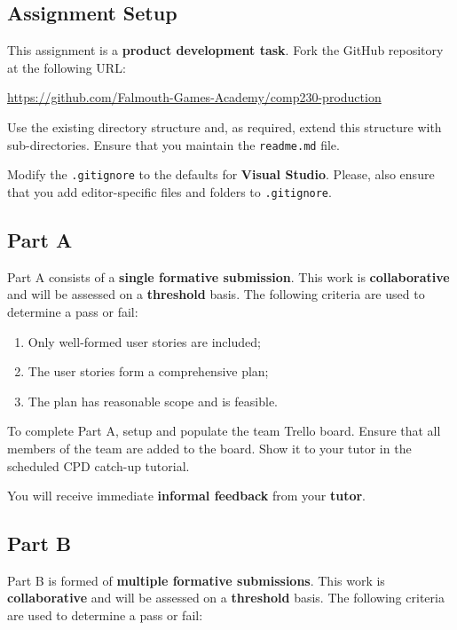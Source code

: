 \documentclass{../fal_assignment}
\begin{document}
\subsection*{Assignment Setup}

This assignment is a \textbf{product development task}. Fork the GitHub repository at the following URL:

\indent \url{https://github.com/Falmouth-Games-Academy/comp230-production}

Use the existing directory structure and, as required, extend this structure with sub-directories. Ensure that you maintain the \texttt{readme.md} file.

Modify the \texttt{.gitignore} to the defaults for \textbf{Visual Studio}. Please, also ensure that you add editor-specific files and folders to \texttt{.gitignore}. 

\subsection*{Part A}

Part A consists of a \textbf{single formative submission}. This work is \textbf{collaborative} and will be assessed on a \textbf{threshold} basis. The following criteria are used to determine a pass or fail:

\begin{enumerate}[label=(\alph*)]
	\item Only well-formed user stories are included;
	\item The user stories form a comprehensive plan;
	\item The plan has reasonable scope and is feasible.
\end{enumerate}

To complete Part A, setup and populate the team Trello board. Ensure that all members of the team are added to the board. Show it to your tutor in the scheduled CPD catch-up tutorial.

You will receive immediate \textbf{informal feedback} from your \textbf{tutor}.

\subsection*{Part B}

Part B is formed of \textbf{multiple formative submissions}. This work is \textbf{collaborative} and will be assessed on a \textbf{threshold} basis. The following criteria are used to determine a pass or fail:
\end{document}
